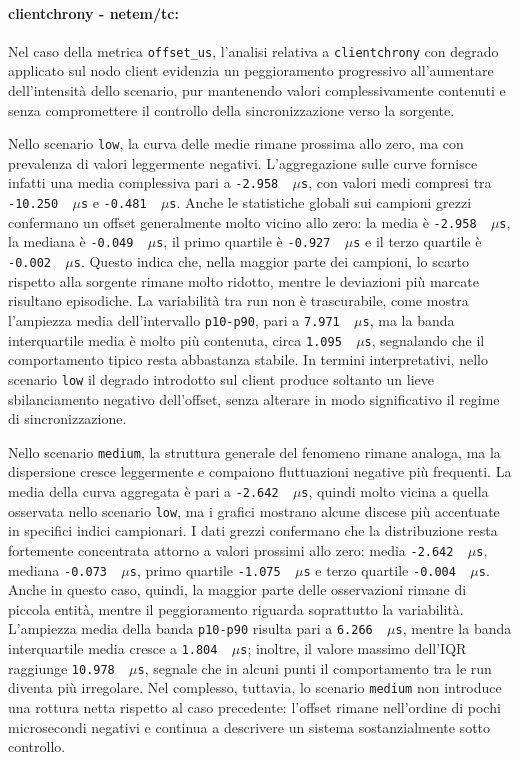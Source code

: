 \paragraph*{clientchrony - netem/tc:}
Nel caso della metrica \texttt{offset\_us}, l'analisi relativa a \texttt{clientchrony}
con degrado applicato sul nodo client evidenzia un peggioramento progressivo all'aumentare
dell'intensità dello scenario, pur mantenendo valori complessivamente contenuti
e senza compromettere il controllo della sincronizzazione verso la sorgente.

Nello scenario \texttt{low}, la curva delle medie rimane prossima allo zero, ma con
prevalenza di valori leggermente negativi. L'aggregazione sulle curve fornisce
infatti una media complessiva pari a \texttt{-2.958 \,$\mu$s}, con valori medi
compresi tra \texttt{-10.250 \,$\mu$s} e \texttt{-0.481 \,$\mu$s}. Anche le statistiche
globali sui campioni grezzi confermano un offset generalmente molto vicino allo zero:
la media è \texttt{-2.958 \,$\mu$s}, la mediana è \texttt{-0.049 \,$\mu$s}, il
primo quartile è \texttt{-0.927 \,$\mu$s} e il terzo quartile è \texttt{-0.002 \,$\mu$s}.
Questo indica che, nella maggior parte dei campioni, lo scarto rispetto alla sorgente
rimane molto ridotto, mentre le deviazioni più marcate risultano episodiche. La variabilità
tra run non è trascurabile, come mostra l'ampiezza media dell'intervallo \texttt{p10-p90},
pari a \texttt{7.971 \,$\mu$s}, ma la banda interquartile media è molto più
contenuta, circa \texttt{1.095 \,$\mu$s}, segnalando che il comportamento tipico resta
abbastanza stabile. In termini interpretativi, nello scenario \texttt{low} il
degrado introdotto sul client produce soltanto un lieve sbilanciamento negativo
dell'offset, senza alterare in modo significativo il regime di sincronizzazione.

Nello scenario \texttt{medium}, la struttura generale del fenomeno rimane analoga,
ma la dispersione cresce leggermente e compaiono fluttuazioni negative più
frequenti. La media della curva aggregata è pari a \texttt{-2.642 \,$\mu$s}, quindi
molto vicina a quella osservata nello scenario \texttt{low}, ma i grafici mostrano
alcune discese più accentuate in specifici indici campionari. I dati grezzi
confermano che la distribuzione resta fortemente concentrata attorno a valori
prossimi allo zero: media \texttt{-2.642 \,$\mu$s}, mediana \texttt{-0.073 \,$\mu$s},
primo quartile \texttt{-1.075 \,$\mu$s} e terzo quartile \texttt{-0.004 \,$\mu$s}.
Anche in questo caso, quindi, la maggior parte delle osservazioni rimane di
piccola entità, mentre il peggioramento riguarda soprattutto la variabilità. L'ampiezza
media della banda \texttt{p10-p90} risulta pari a \texttt{6.266 \,$\mu$s}, mentre
la banda interquartile media cresce a \texttt{1.804 \,$\mu$s}; inoltre, il
valore massimo dell'IQR raggiunge \texttt{10.978 \,$\mu$s}, segnale che in
alcuni punti il comportamento tra le run diventa più irregolare. Nel complesso,
tuttavia, lo scenario \texttt{medium} non introduce una rottura netta rispetto
al caso precedente: l'offset rimane nell'ordine di pochi microsecondi negativi e continua
a descrivere un sistema sostanzialmente sotto controllo.

